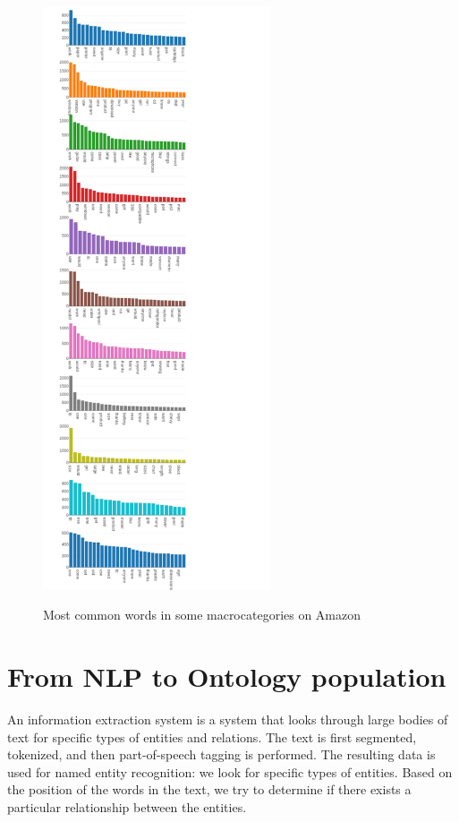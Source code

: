 \documentclass[LaM,oneside,binding=0.6cm]{sapthesis}
\begin{document}
\begin{figure}
\centering
\includegraphics[width=0.6\textwidth]{pictures/words1.png}\\[3ex]
\caption{Most common words in some macrocategories on Amazon}
\label{fig:chunktree}
\end{figure}

\section{From NLP to Ontology population}


An information extraction system is a system that looks through large bodies of text for specific types of entities and relations. The text is first segmented, tokenized, and then part-of-speech tagging is performed. The resulting data is used for named entity recognition: we look for specific types of entities. Based on the position of the words in the text, we try to determine if there exists a particular relationship between the entities. \\
\end{document}
